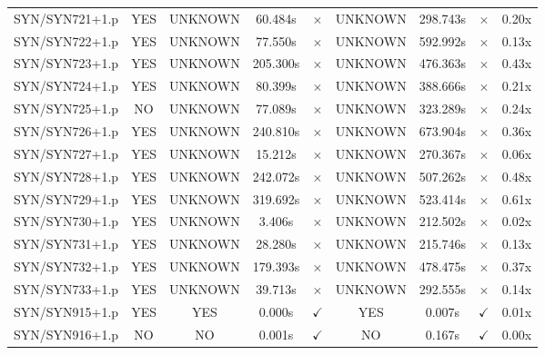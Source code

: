 \documentclass[a4paper,10pt]{article}
\begin{document}
\begin{longtable}{lcccccccc}
SYN/SYN721+1.p & YES & UNKNOWN & 60.484s & \cellcolor{mismatchcolor}$\times$ & UNKNOWN & 298.743s & \cellcolor{mismatchcolor}$\times$ & 0.20x \\
SYN/SYN722+1.p & YES & UNKNOWN & 77.550s & \cellcolor{mismatchcolor}$\times$ & UNKNOWN & 592.992s & \cellcolor{mismatchcolor}$\times$ & 0.13x \\
SYN/SYN723+1.p & YES & UNKNOWN & 205.300s & \cellcolor{mismatchcolor}$\times$ & UNKNOWN & 476.363s & \cellcolor{mismatchcolor}$\times$ & 0.43x \\
SYN/SYN724+1.p & YES & UNKNOWN & 80.399s & \cellcolor{mismatchcolor}$\times$ & UNKNOWN & 388.666s & \cellcolor{mismatchcolor}$\times$ & 0.21x \\
SYN/SYN725+1.p & NO & UNKNOWN & 77.089s & \cellcolor{mismatchcolor}$\times$ & UNKNOWN & 323.289s & \cellcolor{mismatchcolor}$\times$ & 0.24x \\
SYN/SYN726+1.p & YES & UNKNOWN & 240.810s & \cellcolor{mismatchcolor}$\times$ & UNKNOWN & 673.904s & \cellcolor{mismatchcolor}$\times$ & 0.36x \\
SYN/SYN727+1.p & YES & UNKNOWN & 15.212s & \cellcolor{mismatchcolor}$\times$ & UNKNOWN & 270.367s & \cellcolor{mismatchcolor}$\times$ & 0.06x \\
SYN/SYN728+1.p & YES & UNKNOWN & 242.072s & \cellcolor{mismatchcolor}$\times$ & UNKNOWN & 507.262s & \cellcolor{mismatchcolor}$\times$ & 0.48x \\
SYN/SYN729+1.p & YES & UNKNOWN & 319.692s & \cellcolor{mismatchcolor}$\times$ & UNKNOWN & 523.414s & \cellcolor{mismatchcolor}$\times$ & 0.61x \\
SYN/SYN730+1.p & YES & UNKNOWN & 3.406s & \cellcolor{mismatchcolor}$\times$ & UNKNOWN & 212.502s & \cellcolor{mismatchcolor}$\times$ & 0.02x \\
SYN/SYN731+1.p & YES & UNKNOWN & 28.280s & \cellcolor{mismatchcolor}$\times$ & UNKNOWN & 215.746s & \cellcolor{mismatchcolor}$\times$ & 0.13x \\
SYN/SYN732+1.p & YES & UNKNOWN & 179.393s & \cellcolor{mismatchcolor}$\times$ & UNKNOWN & 478.475s & \cellcolor{mismatchcolor}$\times$ & 0.37x \\
SYN/SYN733+1.p & YES & UNKNOWN & 39.713s & \cellcolor{mismatchcolor}$\times$ & UNKNOWN & 292.555s & \cellcolor{mismatchcolor}$\times$ & 0.14x \\
SYN/SYN915+1.p & YES & YES & 0.000s & \cellcolor{matchcolor}$\checkmark$ & YES & 0.007s & \cellcolor{matchcolor}$\checkmark$ & 0.01x \\
SYN/SYN916+1.p & NO & NO & 0.001s & \cellcolor{matchcolor}$\checkmark$ & NO & 0.167s & \cellcolor{matchcolor}$\checkmark$ & 0.00x \\

\end{longtable}
\end{document}
